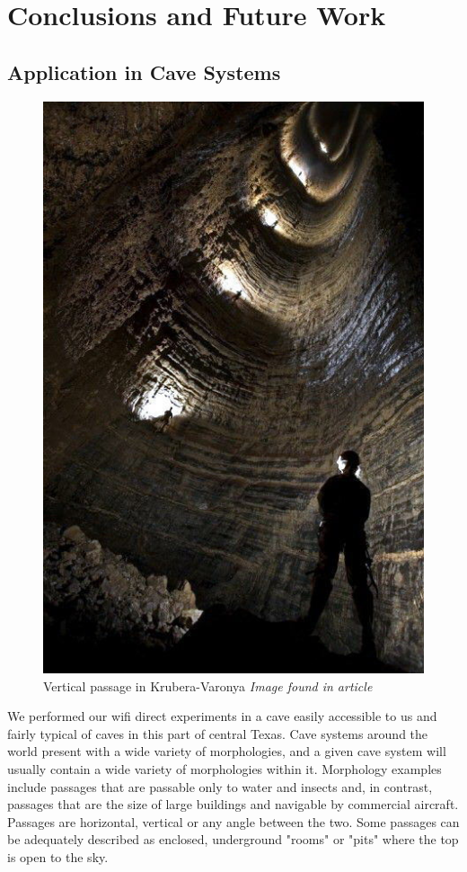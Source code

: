 \documentclass[10pt,twocolumn]{article}
\begin{document}
\section{Conclusions and Future Work}

\subsection{Application in Cave Systems}
\begin{figure}
\includegraphics[width=\columnwidth]{krubera_pit_dark}
\caption{Vertical passage in Krubera-Varonya \textit{Image found in article \cite{krub_blaze}}}
\end{figure}
We performed our wifi direct experiments in a cave easily accessible to us and fairly typical of caves in this part of central Texas.
Cave systems around the world present with a wide variety of morphologies, and a given cave system will usually contain a wide variety of morphologies within it.
Morphology examples include passages that are passable only to water and insects and, in contrast, passages that are the size of large buildings and navigable by commercial aircraft.
Passages are horizontal, vertical or any angle between the two.
Some passages can be adequately described as enclosed, underground "rooms" or "pits" where the top is open to the sky.
\end{document}
